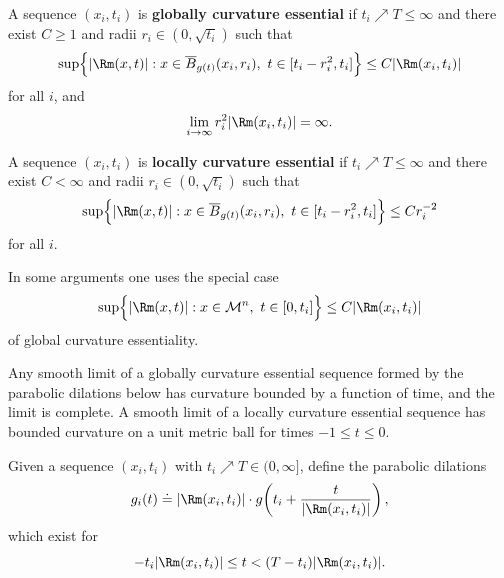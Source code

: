 \begin{definition}
\label{ch08-def-globally-curvature-essential}
A sequence \((x_i,t_i)\) is \textbf{globally curvature essential} if \(t_i\nearrow T\le\infty\) and there exist \(C\ge1\) and radii \(r_i\in(0,\sqrt{t_i})\) such that
\[
\sup\Bigl\{ |\Rm(x,t)| : x\in \overline B_{g(t)}(x_i,r_i),\ t\in[t_i-r_i^2,t_i]\Bigr\}
\le C |\Rm(x_i,t_i)|
\]
for all \(i\), and
\[
\lim_{i\to\infty} r_i^2 |\Rm(x_i,t_i)|=\infty.
\]
\end{definition}

\begin{definition}
\label{ch08-def-locally-curvature-essential}
A sequence \((x_i,t_i)\) is \textbf{locally curvature essential} if \(t_i\nearrow T\le\infty\) and there exist \(C<\infty\) and radii \(r_i\in(0,\sqrt{t_i})\) such that
\[
\sup\Bigl\{ |\Rm(x,t)| : x\in \overline B_{g(t)}(x_i,r_i),\ t\in[t_i-r_i^2,t_i]\Bigr\}
\le C r_i^{-2}
\]
for all \(i\).
\end{definition}

\begin{remark}
\label{ch08-rem-globally-essential-sequences}
In some arguments one uses the special case
\[
\sup\Bigl\{ |\Rm(x,t)| : x\in \mathcal M^n,\ t\in[0,t_i]\Bigr\}\le C|\Rm(x_i,t_i)|
\]
of global curvature essentiality.
\end{remark}

\begin{remark}
\label{ch08-rem-essentiality-consequences}
Any smooth limit of a globally curvature essential sequence formed by the parabolic dilations below has curvature bounded by a function of time, and the limit is complete. A smooth limit of a locally curvature essential sequence has bounded curvature on a unit metric ball for times \(-1\le t\le0\).
\end{remark}

\begin{definition}
\label{ch08-def-parabolic-dilations}
Given a sequence \((x_i,t_i)\) with \(t_i\nearrow T\in(0,\infty]\), define the parabolic dilations
\[
g_i(t)\doteq |\Rm(x_i,t_i)|\cdot g\!\left(t_i+\frac{t}{|\Rm(x_i,t_i)|}\right),
\]
which exist for
\[
-t_i|\Rm(x_i,t_i)|\le t < (T-t_i)|\Rm(x_i,t_i)|.
\]
\end{definition}

